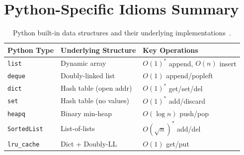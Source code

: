 \documentclass[12pt,a4paper]{article}
\begin{document}
\section{Python-Specific Idioms Summary}

\begin{table}[h]
\centering
\caption{Python built-in data structures and their underlying implementations~\cite{vanrossum2009,lutz2013,ramalho2022}.}
\begin{tabular}{lll}
\toprule
\textbf{Python Type} & \textbf{Underlying Structure} & \textbf{Key Operations} \\
\midrule
\texttt{list}        & Dynamic array          & $O(1)^*$ append, $O(n)$ insert \\
\texttt{deque}       & Doubly-linked list     & $O(1)$ append/popleft \\
\texttt{dict}        & Hash table (open addr) & $O(1)^*$ get/set/del \\
\texttt{set}         & Hash table (no values) & $O(1)^*$ add/discard \\
\texttt{heapq}       & Binary min-heap        & $O(\log n)$ push/pop \\
\texttt{SortedList}  & List-of-lists          & $O(\sqrt{n})^*$ add/del \\
\texttt{lru\_cache}  & Dict + Doubly-LL       & $O(1)$ get/put \\
\bottomrule
\end{tabular}
\end{table}

\clearpage
\printbibliography[heading=bibintoc, title={References}]
\end{document}
